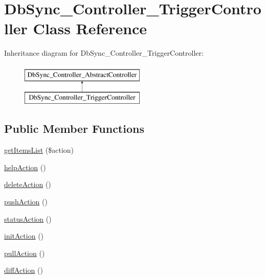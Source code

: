 \hypertarget{classDbSync__Controller__TriggerController}{
\section{DbSync\_\-Controller\_\-TriggerController Class Reference}
\label{classDbSync__Controller__TriggerController}
}
Inheritance diagram for DbSync\_\-Controller\_\-TriggerController:\begin{figure}[H]
\begin{center}
\leavevmode
\includegraphics[height=2.000000cm]{classDbSync__Controller__TriggerController}
\end{center}
\end{figure}
\subsection*{Public Member Functions}
\begin{DoxyCompactItemize}
\item 
\hyperlink{classDbSync__Controller__TriggerController_a18f4eb165243504cf1354464be4ec9de}{getItemsList} (\$action)
\item 
\hyperlink{classDbSync__Controller__TriggerController_a4d53a691eb15f7d060c4db5d14e8c240}{helpAction} ()
\item 
\hyperlink{classDbSync__Controller__TriggerController_af0518cd0c76d9ae0a20b44d2a1c311b0}{deleteAction} ()
\item 
\hyperlink{classDbSync__Controller__TriggerController_a7a8bf618f21e5534784ce34c4a7eed32}{pushAction} ()
\item 
\hyperlink{classDbSync__Controller__TriggerController_a08d8439a825dd363b7fb8df076056f65}{statusAction} ()
\item 
\hyperlink{classDbSync__Controller__TriggerController_ac5ee83f5159f52d4327632347a25c2dd}{initAction} ()
\item 
\hyperlink{classDbSync__Controller__TriggerController_ada505e291b61976b9a9a8b3a1b64e998}{pullAction} ()
\item 
\hyperlink{classDbSync__Controller__TriggerController_a485f3483de2efad7b59b9cb5cef694b4}{diffAction} ()
\end{DoxyCompactItemize}
